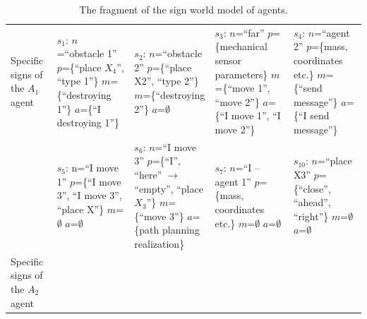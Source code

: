 \documentclass[runningheads,a4paper]{llncs}
\begin{document}
\setlength{\tabcolsep}{5pt}
\renewcommand{\arraystretch}{1.5}
\begin{table}\tiny
	\caption{The fragment of the sign world model of agents.}	
	\label{tab:world}
	\begin{tabular}{| p{1.5cm} | p{2.2cm} | p{2.2cm} | p{2.2cm} | p{2.2cm} |}
		\hline
		Specific signs of the $A_1$ agent
		&
		$s_1$: $n$=``obstacle 1''\newline
		$p$=\{``place $X_4$'', ``type 1''\}\newline
		$m$=\{``destroying 1''\}\newline
		$a$=\{``I destroying 1''\}
		&
		$s_2$: $n$=``obstacle 2''\newline
		$p$=\{``place X2'', ``type 2''\}\newline
		$m$=\{``destroying 2''\}\newline
		$a$=$\emptyset$
		&
		$s_3$: $n$=``far''\newline
		$p$=\{mechanical sensor parameters\}\newline
		$m$=\{``move 1'', ``move 2''\}\newline
		$a$=\{``I move 1'', ``I move 2''\}
		&
		$s_4$: $n$=``agent 2''\newline
		$p$=\{mass, coordinates etc.\}\newline
		$m$=\{``send message''\}\newline
		$a$=\{``I send message''\}
		\\\cline{2-5}
		&
		$s_5$: n=``I move 1''\newline
		$p$=\{``I move 3'', ``I move 3'', ``place X''\}\newline
		$m$=$\emptyset$\newline
		$a$=$\emptyset$	
		&
		$s_6$: $n$=``I move 3''\newline
		$p$=\{``I'', ``here'' $\rightarrow$ ``empty'', ``place $X_3$''\}\newline
		$m$=\{``move 3''\}\newline
		$a$=\{path planning realization\}
		&
		$s_7$: $n$=``I – agent 1''\newline
		$p$=\{mass, coordinates etc.\}\newline
		$m$=$\emptyset$\newline
		$a$=$\emptyset$	
		&
		$s_{10}$: $n$=``place X3''\newline
		$p$=\{``close'', ``ahead'', ``right''\}\newline
		$m$=$\emptyset$\newline
		$a$=$\emptyset$
		\\ \hline
		Specific signs of the $A_2$ agent

\end{tabular}
\end{table}
\end{document}
